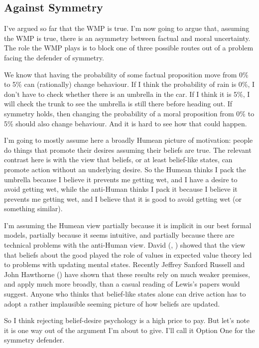 \documentclass[
  10pt,
  letterpaper,
  twoside]{scrbook}
\begin{document}
\subsection{Against Symmetry}\label{against-symmetry}

I've argued so far that the WMP is true. I'm now going to argue that,
assuming the WMP is true, there is an asymmetry between factual and
moral uncertainty. The role the WMP plays is to block one of three
possible routes out of a problem facing the defender of symmetry.

We know that having the probability of some factual proposition move
from 0\% to 5\% can (rationally) change behaviour. If I think the
probability of rain is 0\%, I don't have to check whether there is an
umbrella in the car. If I think it is 5\%, I will check the trunk to see
the umbrella is still there before heading out. If symmetry holds, then
changing the probability of a moral proposition from 0\% to 5\% should
also change behaviour. And it is hard to see how that could happen.

I'm going to mostly assume here a broadly Humean picture of motivation:
people do things that promote their desires assuming their beliefs are
true. The relevant contrast here is with the view that beliefs, or at
least belief-like states, can promote action without an underlying
desire. So the Humean thinks I pack the umbrella because I believe it
prevents me getting wet, and I have a desire to avoid getting wet, while
the anti-Human thinks I pack it because I believe it prevents me getting
wet, and I believe that it is good to avoid getting wet (or something
similar).

I'm assuming the Humean view partially because it is implicit in our
best formal models, partially because it seems intuitive, and partially
because there are technical problems with the anti-Human view. David
(,
) showed that the view that beliefs
about the good played the role of values in expected value theory led to
problems with updating mental states. Recently Jeffrey Sanford Russell
and John Hawthorne () have
shown that these results rely on much weaker premises, and apply much
more broadly, than a casual reading of Lewis's papers would suggest.
Anyone who thinks that belief-like states alone can drive action has to
adopt a rather implausible seeming picture of how beliefs are updated.

So I think rejecting belief-desire psychology is a high price to pay.
But let's note it is one way out of the argument I'm about to give. I'll
call it Option One for the symmetry defender.
\end{document}
